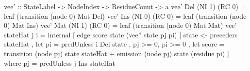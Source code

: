 vee' :: StateLabel -> NodeIndex -> ResidueCount -> a
vee' Del (NI 1) (RC 0) = leaf (transition (node 0) Mat Del)
vee' Ins (NI 0) (RC 0) = leaf (transition (node 0) Mat Ins)
vee' Mat (NI 1) (RC 0) = leaf (transition (node 0) Mat Mat)
vee' stateHat j i = 
  internal [ edge score state (vee'' state pj pi)
           | state <- preceders stateHat
           , let pi = predUnless i Del state
           , pj >= 0, pi >= 0
           , let score = transition (node pj) state stateHat
                         + emission (node pj) state (residue pi)
           ]
  where pj = predUnless j Ins stateHat
